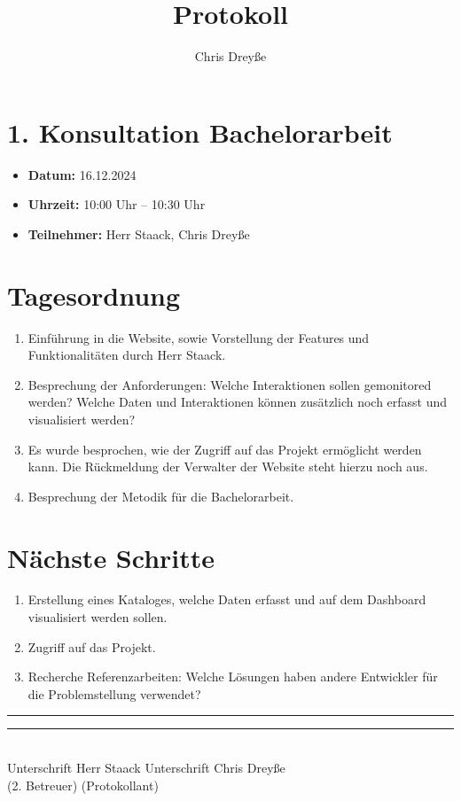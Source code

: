 \documentclass[a4paper,12pt]{article}
\title{Protokoll}
\author{Chris Dreyße}
\date{}
\begin{document}
\maketitle

\section*{1. Konsultation Bachelorarbeit}
\begin{itemize}[label={}]
    \item \textbf{Datum:} 16.12.2024
    \item \textbf{Uhrzeit:} 10:00 Uhr – 10:30 Uhr
    \item \textbf{Teilnehmer:} Herr Staack, Chris Dreyße
\end{itemize}

\section*{Tagesordnung}
\begin{enumerate}
    \item Einführung in die Website, sowie Vorstellung der Features und Funktionalitäten durch Herr Staack.
    \item Besprechung der Anforderungen: Welche Interaktionen sollen gemonitored werden? Welche Daten und Interaktionen können zusätzlich noch erfasst und visualisiert werden?
    \item Es wurde besprochen, wie der Zugriff auf das Projekt ermöglicht werden kann. Die Rückmeldung der Verwalter der Website steht hierzu noch aus.
    \item Besprechung der Metodik für die Bachelorarbeit.
\end{enumerate}

\section*{Nächste Schritte}
\begin{enumerate}
    \item Erstellung eines Kataloges, welche Daten erfasst und auf dem Dashboard visualisiert werden sollen.
    \item Zugriff auf das Projekt.
    \item Recherche Referenzarbeiten: Welche Lösungen haben andere Entwickler für die Problemstellung verwendet?
\end{enumerate}

\vspace{2cm}

\noindent\rule{7cm}{0.4pt} \hfill \rule{7cm}{0.4pt} \\
Unterschrift Herr Staack \hfill Unterschrift Chris Dreyße \\
(2. Betreuer) \hfill (Protokollant)
\end{document}
